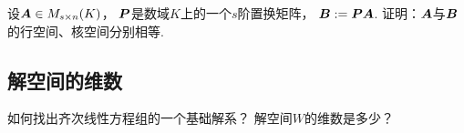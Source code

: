 \begin{example}
设\(\boldsymbol{A} \in M_{s \times n}(K)\)，
\(\boldsymbol{P}\)是数域\(K\)上的一个\(s\)阶置换矩阵，
\(\boldsymbol{B} := \boldsymbol{P} \boldsymbol{A}\).
证明：\(\boldsymbol{A}\)与\(\boldsymbol{B}\)的行空间、核空间分别相等.

\end{example}

\subsection{解空间的维数}
如何找出齐次线性方程组的一个基础解系？
解空间\(W\)的维数是多少？

